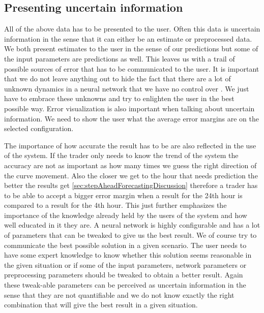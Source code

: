\subsection{Presenting uncertain information}
All of the above data has to be presented to the user. Often this data is uncertain information in the sense that it can either be an estimate or preprocessed data. We both present estimates to the user in the sense of our predictions but some of the input parameters are predictions as well. This leaves us with a trail of possible sources of error that has to be communicated to the user. It is important that we do not leave anything out to hide the fact that there are a lot of unknown dynamics in a neural network that we have no control over \cite{young2010using}. We just have to embrace these unknowns and try to enlighten the user in the best possible way. Error visualization is also important when talking about uncertain information. We need to show the user what the average error margins are on the selected configuration.

The importance of how accurate the result has to be are also reflected in the use of the system. If the trader only needs to know the trend of the system the accuracy are not as important as how many times we guess the right direction of the curve movement. Also the closer we get to the hour that needs prediction the better the results get \ref{sec:stepAheadForecastingDiscussion} therefore a trader has to be able to accept a bigger error margin when a result for the 24th hour is compared to a result for the 4th hour. This just further emphasizes the importance of the knowledge already held by the users of the system and how well educated in it they are. A neural network is highly configurable and has a lot of parameters that can be tweaked to give us the best result. We of course try to communicate the best possible solution in a given scenario. The user needs to have some expert knowledge to know whether this solution seems reasonable in the given situation or if some of the input parameters, network parameters or preprocessing parameters should be tweaked to obtain a better result. Again these tweak-able parameters can be perceived as uncertain information \cite{UncertainInformation} in the sense that they are not quantifiable and we do not know exactly the right combination that will give the best result in a given situation. 


